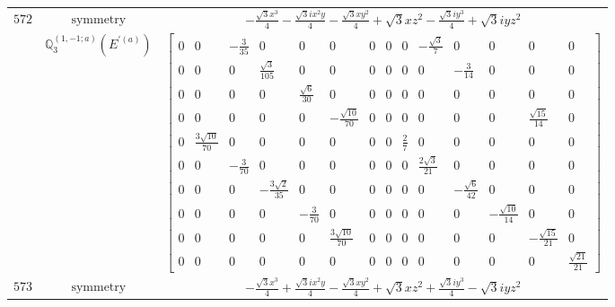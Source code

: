 \documentclass[fleqn,8pt,landscape]{jsarticle}
\begin{document}
\begin{longtable}{ccc}
$ 572 $ & $ \text{symmetry} $ & $ - \frac{\sqrt{3} x^{3}}{4} - \frac{\sqrt{3} i x^{2} y}{4} - \frac{\sqrt{3} x y^{2}}{4} + \sqrt{3} x z^{2} - \frac{\sqrt{3} i y^{3}}{4} + \sqrt{3} i y z^{2} $ \\
$  $ & $ \mathbb{Q}_{3}^{(1,-1;a)}(E^{\prime(a)}) $ & $ \begin{bmatrix} 0 & 0 & - \frac{3}{35} & 0 & 0 & 0 & 0 & 0 & 0 & - \frac{\sqrt{3}}{7} & 0 & 0 & 0 & 0 \\ 0 & 0 & 0 & \frac{\sqrt{3}}{105} & 0 & 0 & 0 & 0 & 0 & 0 & - \frac{3}{14} & 0 & 0 & 0 \\ 0 & 0 & 0 & 0 & \frac{\sqrt{6}}{30} & 0 & 0 & 0 & 0 & 0 & 0 & 0 & 0 & 0 \\ 0 & 0 & 0 & 0 & 0 & - \frac{\sqrt{10}}{70} & 0 & 0 & 0 & 0 & 0 & 0 & \frac{\sqrt{15}}{14} & 0 \\ 0 & \frac{3 \sqrt{10}}{70} & 0 & 0 & 0 & 0 & 0 & 0 & \frac{2}{7} & 0 & 0 & 0 & 0 & 0 \\ 0 & 0 & - \frac{3}{70} & 0 & 0 & 0 & 0 & 0 & 0 & \frac{2 \sqrt{3}}{21} & 0 & 0 & 0 & 0 \\ 0 & 0 & 0 & - \frac{3 \sqrt{2}}{35} & 0 & 0 & 0 & 0 & 0 & 0 & - \frac{\sqrt{6}}{42} & 0 & 0 & 0 \\ 0 & 0 & 0 & 0 & - \frac{3}{70} & 0 & 0 & 0 & 0 & 0 & 0 & - \frac{\sqrt{10}}{14} & 0 & 0 \\ 0 & 0 & 0 & 0 & 0 & \frac{3 \sqrt{10}}{70} & 0 & 0 & 0 & 0 & 0 & 0 & - \frac{\sqrt{15}}{21} & 0 \\ 0 & 0 & 0 & 0 & 0 & 0 & 0 & 0 & 0 & 0 & 0 & 0 & 0 & \frac{\sqrt{21}}{21} \end{bmatrix} $ \\ \hline
$ 573 $ & $ \text{symmetry} $ & $ - \frac{\sqrt{3} x^{3}}{4} + \frac{\sqrt{3} i x^{2} y}{4} - \frac{\sqrt{3} x y^{2}}{4} + \sqrt{3} x z^{2} + \frac{\sqrt{3} i y^{3}}{4} - \sqrt{3} i y z^{2} $ \\

\end{longtable}
\end{document}
